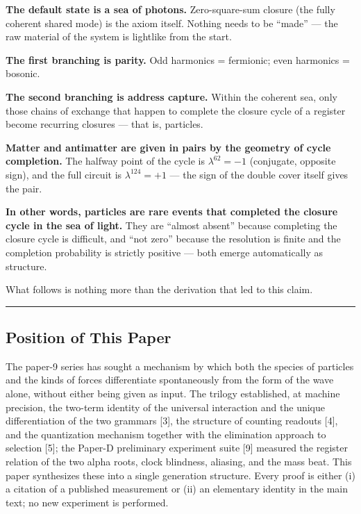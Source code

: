 \documentclass[
  a4paper,
]{article}
\begin{document}
\textbf{The default state is a sea of photons.} Zero-square-sum closure
(the fully coherent shared mode) is the axiom itself. Nothing needs to
be ``made'' --- the raw material of the system is lightlike from the
start.

\textbf{The first branching is parity.} Odd harmonics = fermionic; even
harmonics = bosonic.

\textbf{The second branching is address capture.} Within the coherent
sea, only those chains of exchange that happen to complete the closure
cycle of a register become recurring closures --- that is, particles.

\textbf{Matter and antimatter are given in pairs by the geometry of
cycle completion.} The halfway point of the cycle is \(\lambda^{62}=-1\)
(conjugate, opposite sign), and the full circuit is \(\lambda^{124}=+1\)
--- the sign of the double cover itself gives the pair.

\textbf{In other words, particles are rare events that completed the
closure cycle in the sea of light.} They are ``almost absent'' because
completing the closure cycle is difficult, and ``not zero'' because the
resolution is finite and the completion probability is strictly positive
--- both emerge automatically as structure.

What follows is nothing more than the derivation that led to this claim.

\begin{center}\rule{0.5\linewidth}{0.5pt}\end{center}

\subsection{Position of This Paper}\label{position-of-this-paper}

The paper-9 series has sought a mechanism by which both the species of
particles and the kinds of forces differentiate spontaneously from the
form of the wave alone, without either being given as input. The trilogy
established, at machine precision, the two-term identity of the
universal interaction and the unique differentiation of the two grammars
{[}3{]}, the structure of counting readouts {[}4{]}, and the
quantization mechanism together with the elimination approach to
selection {[}5{]}; the Paper-D preliminary experiment suite {[}9{]}
measured the register relation of the two alpha roots, clock blindness,
aliasing, and the mass beat. This paper synthesizes these into a single
generation structure. Every proof is either (i) a citation of a
published measurement or (ii) an elementary identity in the main text;
no new experiment is performed.
\end{document}
